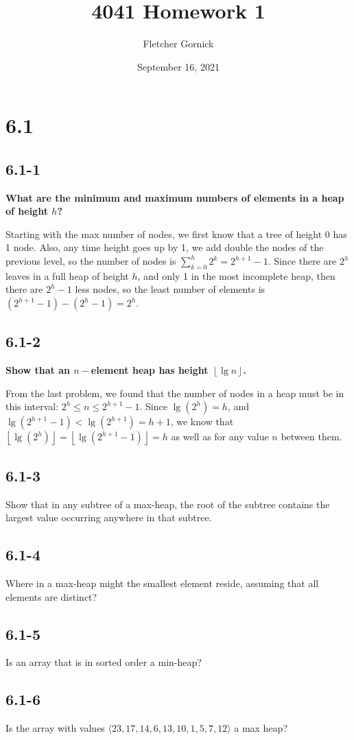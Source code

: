 \documentclass[11pt]{article}
\title{4041 Homework 1}
\author{Fletcher Gornick}
\date{September 16, 2021}
\def\lf{\left\lfloor}
\def\rf{\right\rfloor}
\begin{document}
 \maketitle 
 \section*{6.1}
 \subsection*{6.1-1}
  \textbf{What are the minimum and maximum numbers of elements in a heap of height $h$?}

  Starting with the max number of nodes, we first know that a tree of height 0 has 1 node.
  Also, any time height goes up by 1, we add double the nodes of the previous level, so the
  number of nodes is $\sum_{k=0}^{h}2^{k} = 2^{h+1}-1$.  Since there are $2^h$ leaves in a
  full heap of height $h$, and only 1 in the most incomplete heap, then there are $2^h-1$ less
  nodes, so the least number of elements is $(2^{h+1}-1) - (2^h-1) = 2^h$.

 \subsection*{6.1-2}
  \textbf{Show that an $n-$element heap has height $\lf \lg n \rf$.}

  From the last problem, we found that the number of nodes in a heap must be in this interval:
  $2^h \leq n \leq 2^{h+1}-1$. Since $\lg{(2^h)} = h$, and $\lg{(2^{h+1}-1)} < \lg{(2^{h+1})} = h+1$,
  we know that $\lf \lg{(2^h)} \rf = \lf \lg{(2^{h+1}-1)} \rf = h$ as well as for any value $n$
  between them.
 \subsection*{6.1-3}
  Show that in any subtree of a max-heap, the root of the subtree contains the largest 
  value occurring anywhere in that subtree.
 \subsection*{6.1-4}
  Where in a max-heap might the smallest element reside, assuming that all elements are 
  distinct?
 \subsection*{6.1-5}
  Is an array that is in sorted order a min-heap?
 \subsection*{6.1-6}
  Is the array with values $\langle 23, 17, 14, 6, 13, 10, 1, 5, 7, 12 \rangle$ a max heap?
\end{document}
